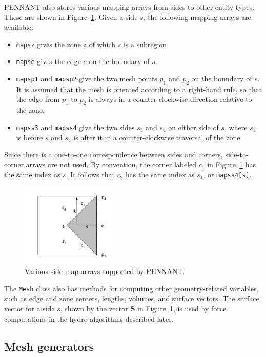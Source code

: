 \documentclass[11pt,letterpaper]{article}
\begin{document}
PENNANT also stores various mapping arrays from sides to other entity
types.  These are shown in Figure~\ref{fig:side}.
Given a side $s$, the following mapping arrays are available:
\begin{itemize}
\item {\tt mapsz} gives the zone $z$ of which $s$ is a subregion.
\item {\tt mapse} gives the edge $e$ on the boundary of $s$.
\item {\tt mapsp1} and {\tt mapsp2} give the two mesh points $p_1$ and
$p_2$ on the boundary of $s$.  It is assumed that the mesh is oriented
according to a right-hand rule, so that the edge from $p_1$ to $p_2$
is always in a counter-clockwise direction relative to the zone.
\item {\tt mapss3} and {\tt mapss4} give the two sides $s_3$ and
$s_4$ on either side of $s$, where $s_3$ is before $s$ and $s_4$ is
after it in a counter-clockwise traversal of the zone.
\end{itemize}
Since there is a one-to-one correspondence between sides and corners,
side-to-corner arrays are not used.  By convention, the corner labeled
$c_1$ in Figure~\ref{fig:side} has the same index as $s$.  It follows
that $c_2$ has the same index as $s_4$, or {\tt mapss4[s]}.

\begin{figure}
    \centering
    \includegraphics[width=0.40\textwidth]{side-maps.png}
    \caption{Various side map arrays supported by PENNANT.}
    \label{fig:side}
\end{figure}

The {\tt Mesh} class also has methods for computing other
geometry-related variables, such as edge and zone centers, lengths,
volumes, and surface vectors.  The surface vector for a side $s$, shown
by the vector {\bf S} in Figure~\ref{fig:side}, is used by force
computations in the hydro algorithms described later.

\subsection{Mesh generators}
\end{document}
